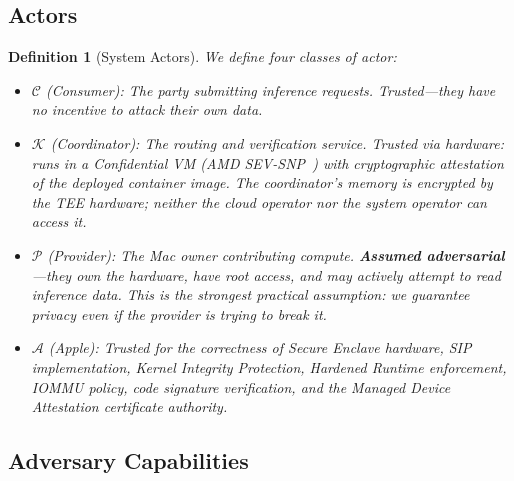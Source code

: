 \documentclass[10pt,twocolumn,letterpaper]{article}
\newtheorem{definition}{Definition}
\begin{document}
\subsection{Actors}

\begin{definition}[System Actors]
\label{def:actors}
We define four classes of actor:
\begin{itemize}[leftmargin=*,itemsep=1pt,topsep=2pt]
    \item $\mathcal{C}$ (Consumer): The party submitting inference requests. Trusted---they have no incentive to attack their own data.
    \item $\mathcal{K}$ (Coordinator): The routing and verification service. Trusted via hardware: runs in a Confidential VM (AMD SEV-SNP~\cite{amd-sev}) with cryptographic attestation of the deployed container image. The coordinator's memory is encrypted by the TEE hardware; neither the cloud operator nor the system operator can access it.
    \item $\mathcal{P}$ (Provider): The Mac owner contributing compute. \textbf{Assumed adversarial}---they own the hardware, have root access, and may actively attempt to read inference data. This is the strongest practical assumption: we guarantee privacy even if the provider is trying to break it.
    \item $\mathcal{A}$ (Apple): Trusted for the correctness of Secure Enclave hardware, SIP implementation, Kernel Integrity Protection, Hardened Runtime enforcement, IOMMU policy, code signature verification, and the Managed Device Attestation certificate authority.
\end{itemize}
\end{definition}

\subsection{Adversary Capabilities}
\end{document}
